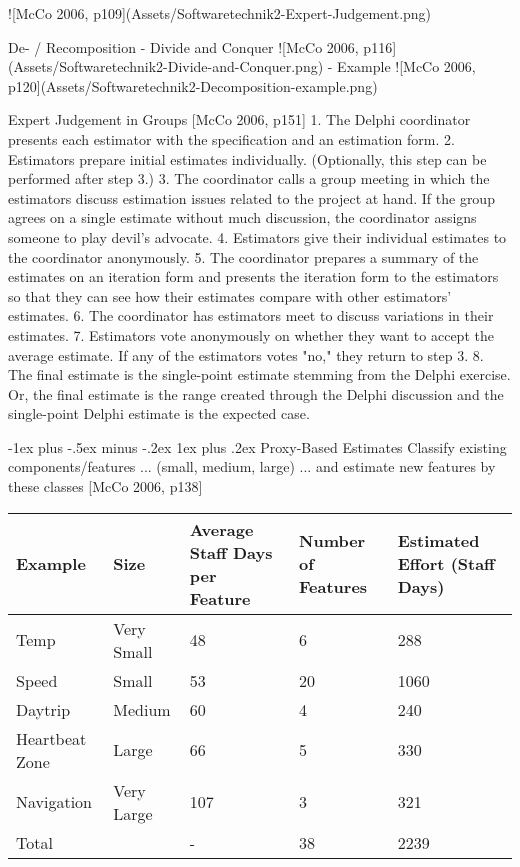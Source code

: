\documentclass[a4paper]{article}
\makeatletter
\renewcommand{\subsubsection}{\@startsection{subsubsection}{3}{0mm}%
                                {-1ex plus -.5ex minus -.2ex}%
                                {1ex plus .2ex}%
                                {\normalfont\small\bfseries}}
\makeatother
\begin{document}
\begin{multicols}{3}
  ![McCo 2006, p109](Assets/Softwaretechnik2-Expert-Judgement.png)
  
  De- / Recomposition
  - Divide and Conquer
      ![McCo 2006, p116](Assets/Softwaretechnik2-Divide-and-Conquer.png)
  - Example
      ![McCo 2006, p120](Assets/Softwaretechnik2-Decomposition-example.png)
  
  
  Expert Judgement in Groups [McCo 2006, p151]
  1. The Delphi coordinator presents each estimator with the specification and an estimation form.
  2. Estimators prepare initial estimates individually. (Optionally, this step can be performed after step 3.)
  3. The coordinator calls a group meeting in which the estimators discuss estimation issues related to the project at hand. If the group agrees on a single estimate without much discussion, the coordinator assigns someone to play devil's advocate.
  4. Estimators give their individual estimates to the coordinator anonymously.
  5. The coordinator prepares a summary of the estimates on an iteration form and presents the iteration form to the estimators so that they can see how their estimates compare with other estimators' estimates.
  6. The coordinator has estimators meet to discuss variations in their estimates.
  7. Estimators vote anonymously on whether they want to accept the average estimate. If any of the estimators votes "no," they return to step 3.
  8. The final estimate is the single-point estimate stemming from the Delphi exercise. Or, the final estimate is the range created through the Delphi discussion and the single-point Delphi estimate is the expected case.
  
  \subsubsection{Proxy-Based Estimates}
  Classify existing components/features ... (small, medium, large) ... and estimate new features by these classes
  [McCo 2006, p138]
  
  \begin{tabular}{l|l|l|l|l}
  Example        & Size       & Average Staff Days per Feature & Number of Features & Estimated Effort (Staff Days) \\\hline
  Temp           & Very Small & 48                             & 6                  & 288                           \\
  Speed          & Small      & 53                             & 20                 & 1060                          \\
  Daytrip        & Medium     & 60                             & 4                  & 240                           \\
  Heartbeat Zone & Large      & 66                             & 5                  & 330                           \\
  Navigation     & Very Large & 107                            & 3                  & 321                           \\
  Total          &            & -                              & 38                 & 2239                          
  \end{tabular}
  

\end{multicols}
\end{document}
